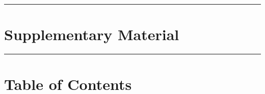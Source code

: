 
\begin{appendices}


\setcounter{equation}{0}
\renewcommand{\theequation}{\thesection.\arabic{equation}}
\newcommand{\appsection}[1]{
  \refstepcounter{section}
  \section*{Appendix \thesection: #1}
  \addcontentsline{toc}{section}{Appendix \thesection: #1}
}


\onecolumn

{\hrule height 1mm}
\vspace*{-0pt}
\section*{\LARGE\bf \centering Supplementary Material
}
\vspace{8pt}
{\hrule height 0.1mm}
\vspace{24pt}

\section*{Table of Contents}
\vspace*{-10pt}
\startcontents[sections]
\setlength{\parskip}{5pt} %

\newpage








\end{appendices}
